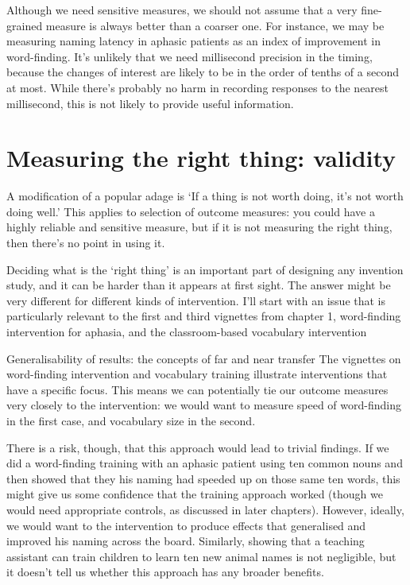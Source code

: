 \documentclass[]{book}
\begin{document}
Although we need sensitive measures, we should not assume that a very fine-grained measure is always better than a coarser one. For instance, we may be measuring naming latency in aphasic patients as an index of improvement in word-finding. It's unlikely that we need millisecond precision in the timing, because the changes of interest are likely to be in the order of tenths of a second at most. While there's probably no harm in recording responses to the nearest millisecond, this is not likely to provide useful information.

\hypertarget{measuring-the-right-thing-validity}{%
\section{Measuring the right thing: validity}\label{measuring-the-right-thing-validity}}

A modification of a popular adage is `If a thing is not worth doing, it's not worth doing well.' This applies to selection of outcome measures: you could have a highly reliable and sensitive measure, but if it is not measuring the right thing, then there's no point in using it.

Deciding what is the `right thing' is an important part of designing any invention study, and it can be harder than it appears at first sight. The answer might be very different for different kinds of intervention. I'll start with an issue that is particularly relevant to the first and third vignettes from chapter 1, word-finding intervention for aphasia, and the classroom-based vocabulary intervention

Generalisability of results: the concepts of far and near transfer
The vignettes on word-finding intervention and vocabulary training illustrate interventions that have a specific focus. This means we can potentially tie our outcome measures very closely to the intervention: we would want to measure speed of word-finding in the first case, and vocabulary size in the second.

There is a risk, though, that this approach would lead to trivial findings. If we did a word-finding training with an aphasic patient using ten common nouns and then showed that they his naming had speeded up on those same ten words, this might give us some confidence that the training approach worked (though we would need appropriate controls, as discussed in later chapters). However, ideally, we would want to the intervention to produce effects that generalised and improved his naming across the board. Similarly, showing that a teaching assistant can train children to learn ten new animal names is not negligible, but it doesn't tell us whether this approach has any broader benefits.
\end{document}
